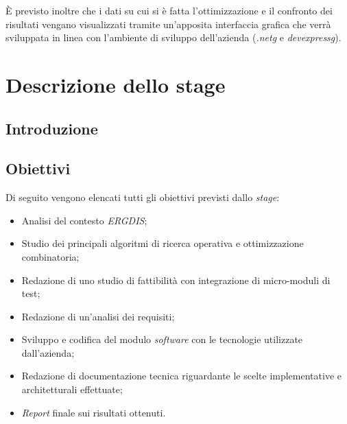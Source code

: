 \noindent È previsto inoltre che i dati su cui si è fatta l'ottimizzazione e il confronto dei risultati vengano visualizzati tramite un'apposita
interfaccia grafica che verrà sviluppata in linea con l'ambiente di sviluppo dell'azienda (\textit{\gls{.netg}} e \textit{\gls{devexpressg}}).


\section{Descrizione dello stage}

\subsection{Introduzione}

\subsection{Obiettivi}

\noindent Di seguito vengono elencati tutti gli obiettivi previsti dallo \textit{stage}:
\begin{itemize}
    \item Analisi del contesto \textit{ERGDIS};
    \item Studio dei principali algoritmi di ricerca operativa e ottimizzazione combinatoria;
    \item Redazione di uno studio di fattibilità con integrazione di micro-moduli di test;
    \item Redazione di un'analisi dei requisiti;
    \item Sviluppo e codifica del modulo \textit{software} con le tecnologie utilizzate dall'azienda;
    \item Redazione di documentazione tecnica riguardante le scelte implementative e architetturali effettuate;
    \item \textit{Report} finale sui risultati ottenuti.
\end{itemize}
